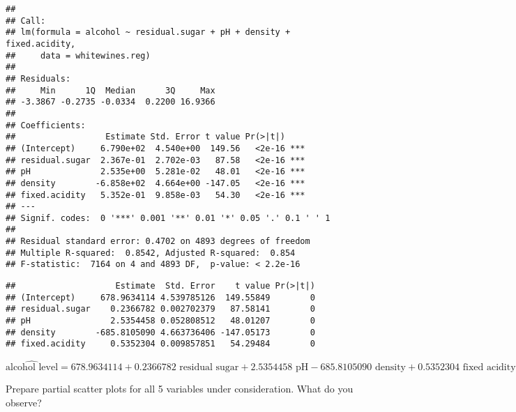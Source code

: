 \documentclass[
]{article}
\newenvironment{Shaded}{\begin{snugshade}}{\end{snugshade}}
\newcommand{\FunctionTok}[1]{\textcolor[rgb]{0.00,0.00,0.00}{#1}}
\newcommand{\NormalTok}[1]{#1}
\newcommand{\SpecialCharTok}[1]{\textcolor[rgb]{0.00,0.00,0.00}{#1}}
\begin{document}
\begin{verbatim}
## 
## Call:
## lm(formula = alcohol ~ residual.sugar + pH + density + fixed.acidity, 
##     data = whitewines.reg)
## 
## Residuals:
##     Min      1Q  Median      3Q     Max 
## -3.3867 -0.2735 -0.0334  0.2200 16.9366 
## 
## Coefficients:
##                  Estimate Std. Error t value Pr(>|t|)    
## (Intercept)     6.790e+02  4.540e+00  149.56   <2e-16 ***
## residual.sugar  2.367e-01  2.702e-03   87.58   <2e-16 ***
## pH              2.535e+00  5.281e-02   48.01   <2e-16 ***
## density        -6.858e+02  4.664e+00 -147.05   <2e-16 ***
## fixed.acidity   5.352e-01  9.858e-03   54.30   <2e-16 ***
## ---
## Signif. codes:  0 '***' 0.001 '**' 0.01 '*' 0.05 '.' 0.1 ' ' 1
## 
## Residual standard error: 0.4702 on 4893 degrees of freedom
## Multiple R-squared:  0.8542, Adjusted R-squared:  0.854 
## F-statistic:  7164 on 4 and 4893 DF,  p-value: < 2.2e-16
\end{verbatim}

\begin{Shaded}
\end{Shaded}

\begin{verbatim}
##                    Estimate  Std. Error    t value Pr(>|t|)
## (Intercept)     678.9634114 4.539785126  149.55849        0
## residual.sugar    0.2366782 0.002702379   87.58141        0
## pH                2.5354458 0.052808512   48.01207        0
## density        -685.8105090 4.663736406 -147.05173        0
## fixed.acidity     0.5352304 0.009857851   54.29484        0
\end{verbatim}

\[\widehat{\text{alcohol level}}=678.9634114+0.2366782\text{ residual sugar}+2.5354458\text{ pH}-685.8105090\text{ density}+0.5352304\text{ fixed acidity}\]

Prepare partial scatter plots for all 5 variables under consideration.
What do you observe?
\end{document}
